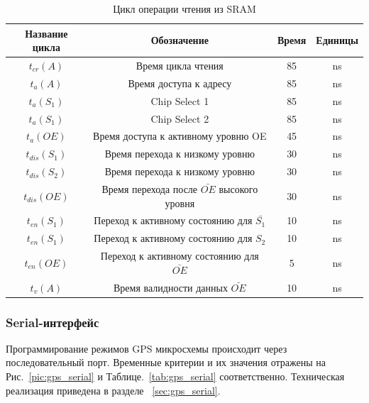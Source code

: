 \begin{table}[H]
\begin{center}
\caption{Цикл операции чтения из SRAM}
\label{tab:sram_read_cycle}
\begin{tabular}{|c|c|c|c|}
	\hline
		Название цикла & Обозначение & Время & Единицы \\
	\hline
		${t_{cr}(A)}$ & Время цикла чтения & 85 & ns \\
	\hline
		${t_a(A)}$ & Время доступа к адресу & 85 & ns \\
	\hline
		${t_a(S_1)}$ & Chip Select 1 & 85 & ns \\
	\hline
		${t_a(S_1)}$ & Chip Select 2 & 85 & ns \\
	\hline
		${t_a(OE)}$ & Время доступа к активному уровню OE & 45 & ns \\
	\hline
		${t_{dis}(S_1)}$ & Время перехода к низкому уровню & 30 & ns \\
	\hline
		${t_{dis}(S_2)}$ & Время перехода к низкому уровню & 30 & ns \\
	\hline
		${t_{dis}(OE)}$ & Время перехода после $\bar{OE}$ высокого уровня & 30 & ns \\
	\hline
		${t_{en}(S_1)}$ & Переход к активному состоянию для $\bar{S_1}$ & 10 & ns \\
	\hline
		${t_{en}(S_1)}$ & Переход к активному состоянию для ${S_2}$ & 10 & ns \\
	\hline
		${t_{en}(OE)}$ & Переход к активному состоянию для $\bar{OE}$ & 5 & ns \\
	\hline
		${t_{v}(A)}$ & Время валидности данных $\bar{OE}$ & 10 & ns \\
	\hline
\end{tabular}
\end{center}
\end{table}

\newpage

\subsubsection{Serial-интерфейс}
Программирование режимов GPS микросхемы происходит через последовательный порт. Временные критерии и их значения
отражены на Рис.~\ref{pic:gps_serial} и Таблице.~\ref{tab:gps_serial} соответственно. Техническая реализация приведена в
разделе ~\ref{sec:gps_serial}.

